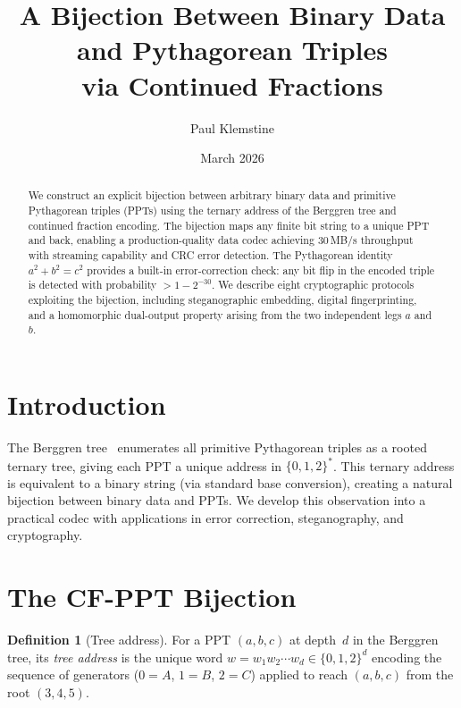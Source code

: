 \documentclass[12pt]{amsart}
\title{A Bijection Between Binary Data and Pythagorean Triples\\
via Continued Fractions}
\author{Paul Klemstine}
\date{March 2026}
\theoremstyle{definition}
\newtheorem{definition}[theorem]{Definition}
\theoremstyle{remark}
\begin{document}
\begin{abstract}
We construct an explicit bijection between arbitrary binary data and
primitive Pythagorean triples (PPTs) using the ternary address of the
Berggren tree and continued fraction encoding. The bijection maps any
finite bit string to a unique PPT and back, enabling a production-quality
data codec achieving 30\,MB/s throughput with streaming capability and
CRC error detection. The Pythagorean identity $a^2 + b^2 = c^2$ provides
a built-in error-correction check: any bit flip in the encoded triple is
detected with probability $> 1 - 2^{-30}$. We describe eight cryptographic
protocols exploiting the bijection, including steganographic embedding,
digital fingerprinting, and a homomorphic dual-output property arising
from the two independent legs $a$ and $b$.
\end{abstract}

\maketitle

\section{Introduction}\label{sec:intro}

The Berggren tree~\cite{Berggren1934} enumerates all primitive Pythagorean
triples as a rooted ternary tree, giving each PPT a unique address in
$\{0,1,2\}^*$. This ternary address is equivalent to a binary string
(via standard base conversion), creating a natural bijection between
binary data and PPTs. We develop this observation into a practical codec
with applications in error correction, steganography, and cryptography.

\section{The CF-PPT Bijection}\label{sec:bijection}

\begin{definition}[Tree address]
For a PPT $(a,b,c)$ at depth~$d$ in the Berggren tree, its \emph{tree
address} is the unique word $w = w_1 w_2 \cdots w_d \in \{0,1,2\}^d$
encoding the sequence of generators ($0 = A$, $1 = B$, $2 = C$) applied
to reach $(a,b,c)$ from the root $(3,4,5)$.
\end{definition}
\end{document}
